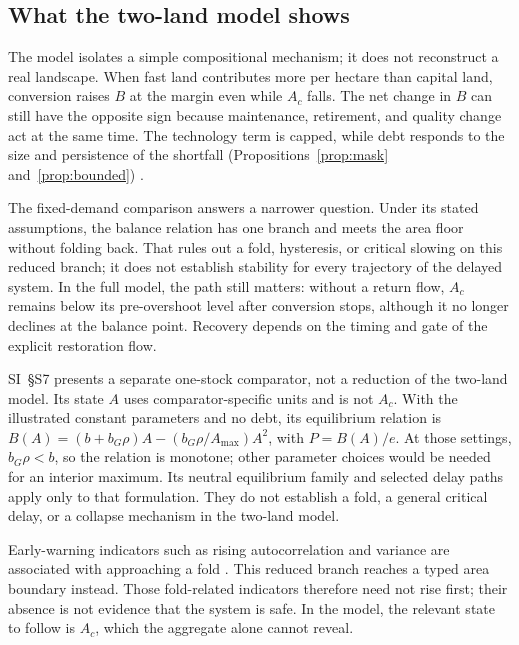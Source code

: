 \documentclass[preprint,12pt,authoryear]{elsarticle}
\begin{document}
\subsection{What the two-land model shows}

The model isolates a simple compositional mechanism; it does not reconstruct a real landscape. When fast land contributes more per hectare than capital land, conversion raises $B$ at the margin even while $A_c$ falls. The net change in $B$ can still have the opposite sign because maintenance, retirement, and quality change act at the same time. The technology term is capped, while debt responds to the size and persistence of the shortfall (Propositions~\ref{prop:mask} and~\ref{prop:bounded}) \citep{Schaefer1954,May1973,Meadows1972,Meadows2004,WackernagelRees1996,BranderTaylor1998}.

The fixed-demand comparison answers a narrower question. Under its stated assumptions, the balance relation has one branch and meets the area floor without folding back. That rules out a fold, hysteresis, or critical slowing on this reduced branch; it does not establish stability for every trajectory of the delayed system. In the full model, the path still matters: without a return flow, $A_c$ remains below its pre-overshoot level after conversion stops, although it no longer declines at the balance point. Recovery depends on the timing and gate of the explicit restoration flow.

SI~\S S7 presents a separate one-stock comparator, not a reduction of the two-land model. Its state $A$ uses comparator-specific units and is not $A_c$. With the illustrated constant parameters and no debt, its equilibrium relation is $B(A)=(b+b_G\rho)A-(b_G\rho/A_{\max})A^2$, with $P=B(A)/e$. At those settings, $b_G\rho<b$, so the relation is monotone; other parameter choices would be needed for an interior maximum. Its neutral equilibrium family and selected delay paths apply only to that formulation. They do not establish a fold, a general critical delay, or a collapse mechanism in the two-land model.

Early-warning indicators such as rising autocorrelation and variance are associated with approaching a fold \citep{Scheffer2001}. This reduced branch reaches a typed area boundary instead. Those fold-related indicators therefore need not rise first; their absence is not evidence that the system is safe. In the model, the relevant state to follow is $A_c$, which the aggregate alone cannot reveal.
\end{document}

